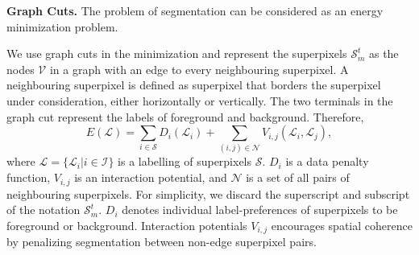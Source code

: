 \textbf{Graph Cuts.}
The problem of segmentation can be considered as an energy minimization problem.


We use graph cuts in the minimization and represent the superpixels $\mathcal{S}_{m}^{t}$ as the nodes $\mathcal{V}$ in a graph with an edge to every neighbouring superpixel. A neighbouring superpixel is defined as superpixel that borders the superpixel under consideration, either horizontally or vertically. The two terminals in the graph cut represent the labels of foreground and background. Therefore,
\begin{equation}
E(\mathcal{L})=\sum_{i\in\mathcal{S}}{D_{i}(\mathcal{L}_{i})}+\sum_{(i,j)\in\mathcal{N}}{V_{i,j}(\mathcal{L}_{i},\mathcal{L}_{j})},
\end{equation}
where $\mathcal{L}=\{\mathcal{L}_{i}|i\in\mathcal{I}\}$ is a labelling of superpixels $\mathcal{S}$. $D_{i}$ is a data penalty function, $V_{i,j}$ is an interaction potential, and $\mathcal{N}$ is a set of all pairs of neighbouring superpixels.
For simplicity, we discard the superscript and subscript of the notation $\mathcal{S}_{m}^{t}$.
$D_{i}$ denotes individual label-preferences of superpixels to be foreground or background.
Interaction potentials $V_{i,j}$ encourages spatial coherence by penalizing segmentation between non-edge superpixel pairs.

